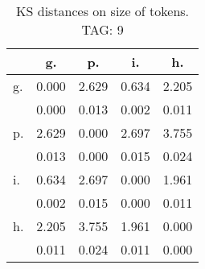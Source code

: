 \begin{table}[h!]
\begin{center}
\begin{tabular}{| l | c | c | c | c |}\hline
 & g. & p. & i. & h. \\\hline
g. & 0.000  & 2.629  & 0.634  & 2.205 \\\hline
 & 0.000  & 0.013  & 0.002  & 0.011 \\\hline
p. & 2.629  & 0.000  & 2.697  & 3.755 \\\hline
 & 0.013  & 0.000  & 0.015  & 0.024 \\\hline
i. & 0.634  & 2.697  & 0.000  & 1.961 \\\hline
 & 0.002  & 0.015  & 0.000  & 0.011 \\\hline
h. & 2.205  & 3.755  & 1.961  & 0.000 \\\hline
 & 0.011  & 0.024  & 0.011  & 0.000 \\\hline
\end{tabular}
\caption{KS distances on size of tokens. TAG: 9}
\end{center}
\end{table}